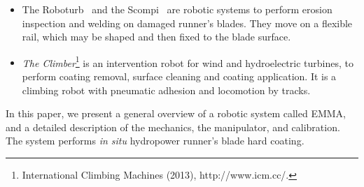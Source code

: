 \begin{itemize}
\item The Roboturb~\cite{roboturb} and the Scompi~\cite{scompi} are robotic
systems to perform erosion inspection and welding on damaged runner's blades.
They move on a flexible rail, which may be shaped and then fixed to the blade
surface.

\item \textit{The Climber}\footnote{International Climbing Machines (2013),
http://www.icm.cc/.} %
 is an intervention robot for wind and hydroelectric turbines, to perform
coating removal, surface cleaning and coating application. It is a climbing
robot with pneumatic adhesion and locomotion by tracks.
\end{itemize}

In this paper, we present a general overview of a robotic system called EMMA,
and a detailed description of the mechanics, the manipulator, and
calibration. The system performs \textit{in situ} hydropower
runner's blade hard coating.


\begin{comment}
, and it is composed of an industrial manipulator
that moves on customized rails, a 3D laser scanner for mapping, and
sensors for positioning feedback.
The system operate in a confined space, move
on a sloping and slippery environment through a rail, identify the runner's
blades, calibrate its position, generate the path planning and perform the hard
coating. 


This text is organized as follows: a general overview of the robot and its main
challenges are presented in Section \ref{sec:general_overview}, detailed
descriptions of the embedded electronics, the vehicle support system, power
supply system, and software architecture are taken in
Sections \ref{sec:electronics_overview}, \ref{sec:powersupply_overview}, and
\ref{sec:software} respectively.
In Section \ref{sec:results}, preliminary results are shown, and concluding
remarks are drawn in Section \ref{sec:conclusions}.
\end{comment}